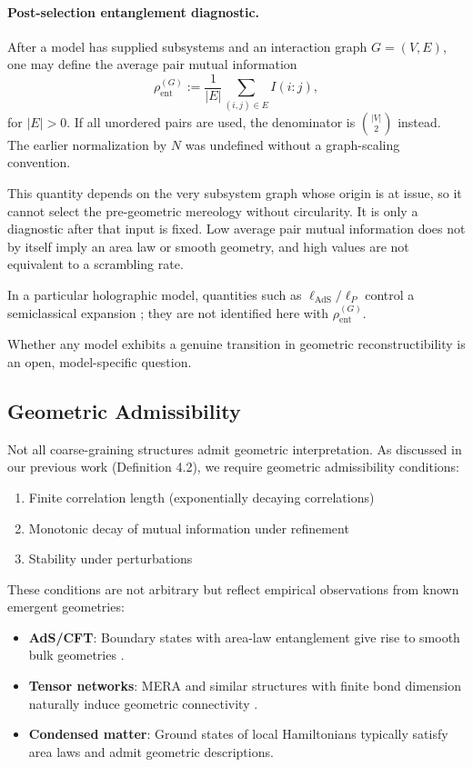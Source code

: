 \documentclass[12pt,a4paper,openany]{book}
\begin{document}
\paragraph{Post-selection entanglement diagnostic.}
After a model has supplied subsystems and an interaction graph $G=(V,E)$, one may define the average pair mutual information
\begin{equation}
\rho_{\mathrm{ent}}^{(G)}
:=\frac{1}{|E|}\sum_{(i,j)\in E} I(i:j),
\end{equation}
for $|E|>0$.  If all unordered pairs are used, the denominator is $\binom{|V|}{2}$ instead.  The earlier normalization by $N$ was undefined without a graph-scaling convention.

This quantity depends on the very subsystem graph whose origin is at issue, so it cannot select the pre-geometric mereology without circularity.  It is only a diagnostic after that input is fixed.  Low average pair mutual information does not by itself imply an area law or smooth geometry, and high values are not equivalent to a scrambling rate.

In a particular holographic model, quantities such as $\ell_{\mathrm{AdS}}/\ell_P$ control a semiclassical expansion \cite{Maldacena1999}; they are not identified here with $\rho_{\mathrm{ent}}^{(G)}$.

Whether any model exhibits a genuine transition in geometric reconstructibility is an open, model-specific question.

\subsection{Geometric Admissibility}

Not all coarse-graining structures admit geometric interpretation. As discussed in our previous work (Definition 4.2), we require geometric admissibility conditions:
\begin{enumerate}
\item Finite correlation length (exponentially decaying correlations)
\item Monotonic decay of mutual information under refinement
\item Stability under perturbations
\end{enumerate}

These conditions are not arbitrary but reflect empirical observations from known emergent geometries:
\begin{itemize}
\item \textbf{AdS/CFT}: Boundary states with area-law entanglement give rise to smooth bulk geometries \cite{RyuTakayanagi2006}.
\item \textbf{Tensor networks}: MERA and similar structures with finite bond dimension naturally induce geometric connectivity \cite{Swingle2012}.
\item \textbf{Condensed matter}: Ground states of local Hamiltonians typically satisfy area laws and admit geometric descriptions.
\end{itemize}
\end{document}
